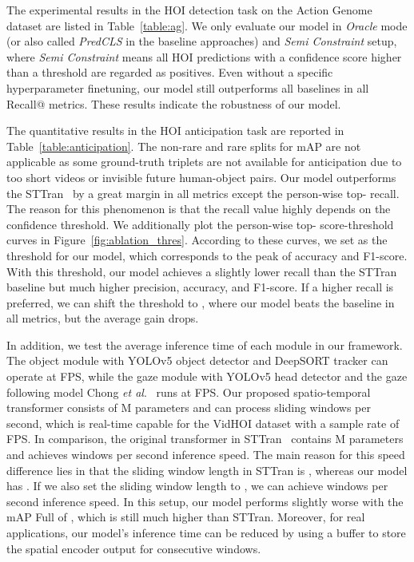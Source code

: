 \documentclass[times,twocolumn,final,authoryear]{elsarticle}
\makeatletter
\newcommand{\etal}{\emph{et al}.\@}
\makeatother
\begin{document}
The experimental results in the HOI detection task on the Action Genome dataset are listed in Table~\ref{table:ag}. We only evaluate our model in \emph{Oracle} mode (or also called \emph{PredCLS} in the baseline approaches) and \emph{Semi Constraint} setup, where \emph{Semi Constraint} means all HOI predictions with a confidence score higher than a threshold are regarded as positives. Even without a specific hyperparameter finetuning, our model still outperforms all baselines in all Recall@ metrics. These results indicate the robustness of our model.  

The quantitative results in the HOI anticipation task are reported in Table~\ref{table:anticipation}. The non-rare and rare splits for mAP are not applicable as some ground-truth triplets are not available for anticipation due to too short videos or invisible future human-object pairs. Our model outperforms the STTran~\citep{hoi_v2:sttran} by a great margin in all metrics except the person-wise top- recall. The reason for this phenomenon is that the recall value highly depends on the confidence threshold. We additionally plot the person-wise top- score-threshold curves in Figure~\ref{fig:ablation_thres}. According to these curves, we set  as the threshold for our model, which corresponds to the peak of accuracy and F1-score. With this threshold, our model achieves a slightly lower recall than the STTran baseline but much higher precision, accuracy, and F1-score. If a higher recall is preferred, we can shift the threshold to , where our model beats the baseline in all metrics, but the average gain drops. 

In addition, we test the average inference time of each module in our framework. The object module with YOLOv5 object detector and DeepSORT tracker can operate at  FPS, while the gaze module with YOLOv5 head detector and the gaze following model Chong \etal~\citep{gaze:detecting_attended} runs at  FPS. Our proposed spatio-temporal transformer consists of M parameters and can process  sliding windows per second, which is real-time capable for the VidHOI dataset with a sample rate of  FPS. In comparison, the original transformer in STTran~\citep{hoi_v2:sttran} contains M parameters and achieves  windows per second inference speed. The main reason for this speed difference lies in that the sliding window length  in STTran is , whereas our model has . If we also set the sliding window length to , we can achieve  windows per second inference speed. In this setup, our model performs slightly worse with the mAP Full of , which is still much higher than STTran. Moreover, for real applications, our model's inference time can be reduced by using a buffer to store the spatial encoder output for consecutive windows. 
\end{document}
